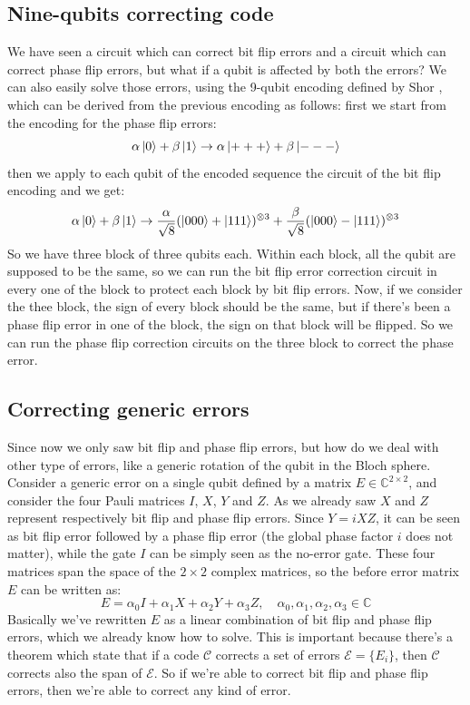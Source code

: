 \documentclass{article}
\begin{document}
	\subsection{Nine-qubits correcting code}
	We have seen a circuit which can correct bit flip errors and a circuit which can correct phase flip errors, but what if a qubit is affected by both the errors? We can also easily solve those errors, using the 9-qubit encoding defined by Shor \cite{PhysRevA.52.R2493}, which can be derived from the previous encoding as follows: first we start from the encoding for the phase flip errors:
	\[ \alpha\ket{0} + \beta\ket{1} \rightarrow \alpha\ket{+++} + \beta\ket{---}\]
	then we apply to each qubit of the encoded sequence the circuit of the bit flip encoding and we get:
	\[ \alpha\ket{0} + \beta\ket{1} \rightarrow \frac{\alpha}{\sqrt{8}}(\ket{000} + \ket{111})^{\otimes 3}+ \frac{\beta}{\sqrt{8}} (\ket{000} - \ket{111})^{\otimes 3}\]
	So we have three block of three qubits each. Within each block, all the qubit are supposed to be the same, so we can run the bit flip error correction circuit in every one of the block to protect each block by bit flip errors. Now, if we consider the thee block, the sign of every block should be the same, but if there's been a phase flip error in one of the block, the sign on that block will be flipped. So we can run the phase flip correction circuits on the three block to correct the phase error.  
	

	
	\subsection{Correcting generic errors}
	Since now we only saw bit flip and phase flip errors, but how do we deal with other type of errors, like a generic rotation of the qubit in the Bloch sphere. Consider a generic error on a single qubit defined by a matrix $E \in \mathbb{C}^{2 \times 2}$, and consider the four Pauli matrices $I$, $X$, $Y$ and $Z$. As we already saw $X$ and $Z$ represent respectively bit flip and phase flip errors. Since $Y = iXZ$, it can be seen as bit flip error followed by a phase flip error (the global phase factor $i$ does not matter), while the gate $I$ can be simply seen as the no-error gate. These four matrices span the space of the $2 \times 2$ complex matrices, so the before error matrix $E$ can be written as:
	\[ E = \alpha_0I + \alpha_1X + \alpha_2Y + \alpha_3Z, \quad \alpha_0, \alpha_1, \alpha_2, \alpha_3 \in \mathbb{C}\]
	Basically we've rewritten $E$ as a linear combination of bit flip and phase flip errors, which we already know how to solve. This is important because there's a theorem which state that if a code $\mathcal{C}$ corrects a set of errors $\mathcal{E} = \{E_i\}$, then $\mathcal{C}$ corrects also the span of $\mathcal{E}$. So if we're able to correct bit flip and phase flip errors, then we're able to correct any kind of error. 
		
	
	
	
\end{document}
